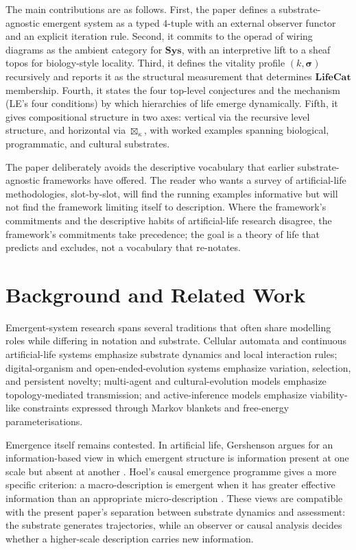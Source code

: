 \documentclass[journal]{IEEEtran}
\theoremstyle{plain}
\theoremstyle{definition}
\theoremstyle{plain}
\begin{document}
The main contributions are as follows. First, the paper defines a
substrate-agnostic emergent system as a typed 4-tuple with an external
observer functor and an explicit iteration rule. Second, it commits to the
operad of wiring diagrams as the ambient category for $\mathbf{Sys}$, with
an interpretive lift to a sheaf topos for biology-style locality. Third,
it defines the vitality profile $(k, \boldsymbol{\sigma})$ recursively and
reports it as the structural measurement that determines $\mathbf{LifeCat}$
membership. Fourth, it states the four top-level conjectures and the
mechanism (LE's four conditions) by which hierarchies of life emerge
dynamically. Fifth, it gives compositional structure in two axes: vertical
via the recursive level structure, and horizontal via $\boxtimes_\kappa$,
with worked examples spanning biological, programmatic, and cultural
substrates.

The paper deliberately avoids the descriptive vocabulary that earlier
substrate-agnostic frameworks have offered. The reader who wants a survey
of artificial-life methodologies, slot-by-slot, will find the running
examples informative but will not find the framework limiting itself to
description. Where the framework's commitments and the descriptive habits
of artificial-life research disagree, the framework's commitments take
precedence; the goal is a theory of life that predicts and excludes, not a
vocabulary that re-notates.

\section{Background and Related Work}\label{sec:background}

Emergent-system research spans several traditions that often share modelling
roles while differing in notation and substrate. Cellular automata and
continuous artificial-life systems emphasize substrate dynamics and local
interaction rules; digital-organism and open-ended-evolution systems emphasize
variation, selection, and persistent novelty; multi-agent and cultural-evolution
models emphasize topology-mediated transmission; and active-inference models
emphasize viability-like constraints expressed through Markov blankets and
free-energy parameterisations.

Emergence itself remains contested. In artificial life, Gershenson argues for
an information-based view in which emergent structure is information present at
one scale but absent at another \cite{gershenson2023emergence}. Hoel's causal
emergence programme gives a more specific criterion: a macro-description is
emergent when it has greater effective information than an appropriate
micro-description \cite{hoel2013macro,hoel2017map}. These views are compatible
with the present paper's separation between substrate dynamics and assessment:
the substrate generates trajectories, while an observer or causal analysis
decides whether a higher-scale description carries new information.
\end{document}

